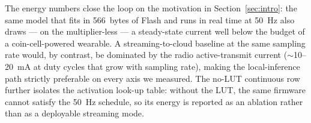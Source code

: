 \begin{table}[t]
\centering
\caption{Derived energy for the \msp{} deployment.
$E$/inference\,=\,$P_{\text{cont}} \times t_{\text{step}}$;
$E$/window\,=\,$P \times T_{\text{window}}$ for the 50\,Hz streaming
row (128 samples $\times$ 20\,ms\,=\,2.56\,s, with LPM sleep between
steps).
Battery life uses a 2000\,mAh / 3.7\,V Li-ion cell (7.4\,Wh).
The no-LUT row is an ablation: without the LUT the 20\,ms streaming
deadline is missed ($t_{\text{step}}\approx421$\,ms), so no 50\,Hz
streaming figure exists; the continuous column quantifies the
per-inference energy penalty.}
\label{tab:energy-derived}
\end{table}

The energy numbers close the loop on the motivation in
Section~\ref{sec:intro}: the same model that fits in 566~bytes of
Flash and runs in real time at 50~Hz also draws --- on the
multiplier-less \msp{} --- a steady-state current well below the
budget of a coin-cell-powered wearable. A streaming-to-cloud
baseline at the same sampling rate would, by contrast, be dominated
by the radio active-transmit current ($\sim$10--20~mA at duty cycles
that grow with sampling rate), making the local-inference path
strictly preferable on every axis we measured. The no-LUT continuous
row further isolates the activation look-up table: without the LUT,
the same firmware cannot satisfy the 50~Hz schedule, so its energy is
reported as an ablation rather than as a deployable streaming mode.
